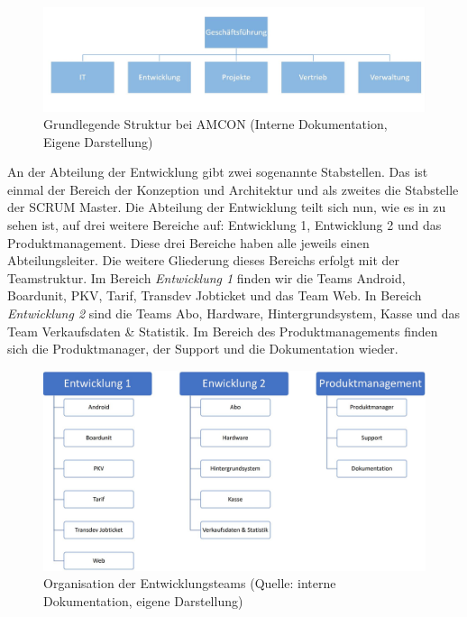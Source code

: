         \begin{figure}[ht]
            \centering
            \includegraphics[width = 1\textwidth]{Eigene Darstellungen/OrganigrammEinfach.JPG}
            \caption{Grundlegende Struktur bei AMCON (Interne Dokumentation, Eigene Darstellung)}
        \end{figure}

        An der Abteilung der Entwicklung gibt zwei sogenannte Stabstellen. Das ist einmal der Bereich der Konzeption und
        Architektur und als zweites die Stabstelle der SCRUM Master. Die Abteilung der Entwicklung teilt sich nun, wie
        es in  zu sehen ist, auf drei weitere Bereiche auf: Entwicklung 1, Entwicklung 2 und das 
        Produktmanagement. Diese drei Bereiche haben alle jeweils einen Abteilungsleiter. Die weitere Gliederung dieses
        Bereichs erfolgt mit der Teamstruktur. Im Bereich \emph{Entwicklung 1} finden wir die Teams Android, Boardunit, 
        PKV, Tarif, Transdev Jobticket und das Team Web. In Bereich \emph{Entwicklung 2} sind die Teams Abo, Hardware, 
        Hintergrundsystem, Kasse und das Team Verkaufsdaten \& Statistik. Im Bereich des Produktmanagements finden sich 
        die Produktmanager, der Support und die Dokumentation wieder.

        \begin{figure}[ht]
            \centering
            \includegraphics[width = 1\textwidth]{Eigene Darstellungen/Entwicklung.JPG}
            \caption{Organisation der Entwicklungsteams (Quelle: interne Dokumentation, eigene Darstellung)} 
            \label{Entwicklung}
        \end{figure}

